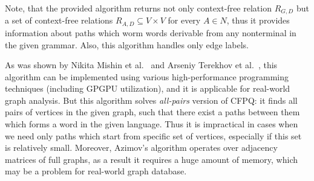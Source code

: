 Note, that the provided algorithm returns not only context-free relation $R_{G,D}$ but a set of context-free relations $R_{A,D} \subseteq V \times V$ for every $A \in N$, thus it provides information about paths which worm words derivable from any nonterminal in the given grammar.
Also, this algorithm handles only edge labels.

As was shown by Nikita Mishin et al.~\cite{Mishin:2019:ECP:3327964.3328503} and Arseniy Terekhov et al.~\cite{ 10.1145/3398682.3399163}, this algorithm can be implemented using various high-performance programming techniques (including GPGPU utilization), and it is applicable for real-world graph analysis.
But this algorithm solves \textit{all-pairs} version of CFPQ: it finds all pairs of vertices in the given graph, such that there exist a paths between them which forms a word in the given language.
Thus it is impractical in cases when we need only paths which start from specific set of vertices, especially if this set is relatively small. 
Moreover, Azimov's algorithm operates over adjacency matrices of full graphs, as a result it requires a huge amount of memory, which may be a problem for real-world graph database.